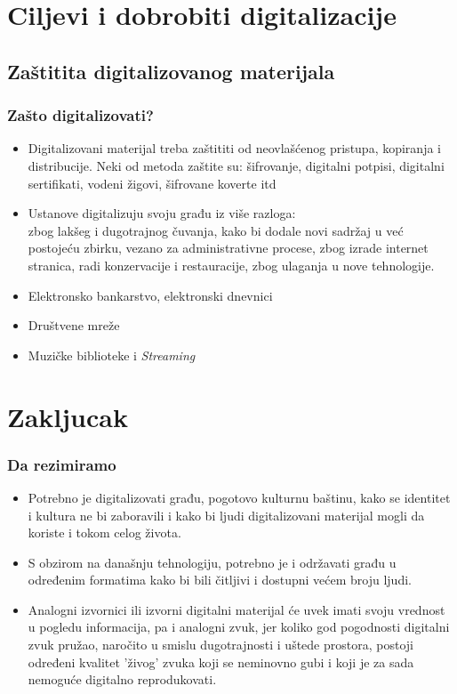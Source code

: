 \documentclass{beamer}
\begin{document}
\section{Ciljevi i dobrobiti digitalizacije}
\subsection{Zaštitita digitalizovanog materijala}
\begin{frame}[fragile]\frametitle{Zašto digitalizovati?}
	\begin{itemize}	
		\item Digitalizovani materijal treba zaštititi od neovlašćenog pristupa, kopiranja i distribucije. Neki od metoda zaštite su: 
		šifrovanje, digitalni potpisi, digitalni sertifikati, vodeni žigovi, šifrovane koverte itd 
		\item Ustanove digitalizuju svoju građu iz više razloga:\\
		zbog lakšeg i dugotrajnog čuvanja, kako bi dodale novi sadržaj u već postojeću zbirku, vezano za administrativne procese, zbog izrade internet stranica, radi konzervacije i restauracije, zbog ulaganja u nove tehnologije.
		\item Elektronsko bankarstvo, elektronski dnevnici
		\item Društvene mreže
		\item Muzičke biblioteke i \textit{Streaming}
	\end{itemize}
\end{frame}

\section{Zakljucak}

\begin{frame}[fragile]\frametitle{Da rezimiramo}
	\begin{itemize}	
		\item Potrebno je digitalizovati građu, pogotovo kulturnu baštinu, kako se identitet i kultura ne bi zaboravili i kako bi ljudi  
		digitalizovani materijal mogli da koriste i tokom celog života.
		\item S obzirom na današnju tehnologiju, potrebno je i održavati građu u određenim formatima kako bi bili čitljivi i dostupni većem broju ljudi.
		\item Analogni izvornici ili izvorni digitalni materijal će uvek imati svoju vrednost u pogledu informacija, pa i analogni zvuk, 
		jer koliko god pogodnosti digitalni zvuk pružao, naročito u smislu dugotrajnosti i uštede prostora, 
		postoji određeni kvalitet 'živog' zvuka koji se neminovno gubi i koji je za sada nemoguće digitalno reprodukovati.
	\end{itemize}
	
\end{frame}
\end{document}
